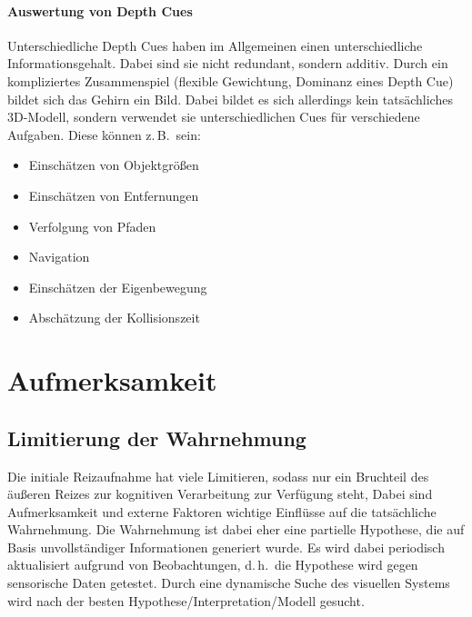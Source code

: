\documentclass[a4paper, 11pt, accentcolor = tud3b]{tudreport}
\renewcommand{\dh}{d.\,h.~}
\newcommand{\zB}{z.\,B.~}
\begin{document}
					\paragraph{Auswertung von Depth Cues}
						Unterschiedliche Depth Cues haben im Allgemeinen einen unterschiedliche Informationsgehalt. Dabei sind sie nicht redundant, sondern additiv. Durch ein kompliziertes Zusammenspiel (flexible Gewichtung, Dominanz eines Depth Cue) bildet sich das Gehirn ein Bild. Dabei bildet es sich allerdings kein tatsächliches 3D-Modell, sondern verwendet sie unterschiedlichen Cues für verschiedene Aufgaben. Diese können \zB sein:
						\begin{itemize}
							\item Einschätzen von Objektgrößen
							\item Einschätzen von Entfernungen
							\item Verfolgung von Pfaden
							\item Navigation
							\item Einschätzen der Eigenbewegung
							\item Abschätzung der Kollisionszeit
						\end{itemize}

		\section{Aufmerksamkeit}
			\subsection{Limitierung der Wahrnehmung}
				Die initiale Reizaufnahme hat viele Limitieren, sodass nur ein Bruchteil des äußeren Reizes zur kognitiven Verarbeitung zur Verfügung steht, Dabei sind Aufmerksamkeit und externe Faktoren wichtige Einflüsse auf die tatsächliche Wahrnehmung. Die Wahrnehmung ist dabei eher eine partielle Hypothese, die auf Basis unvollständiger Informationen generiert wurde. Es wird dabei periodisch aktualisiert aufgrund von Beobachtungen, \dh die Hypothese wird gegen sensorische Daten getestet. Durch eine dynamische Suche des visuellen Systems wird nach der besten Hypothese/Interpretation/Modell gesucht.
\end{document}
